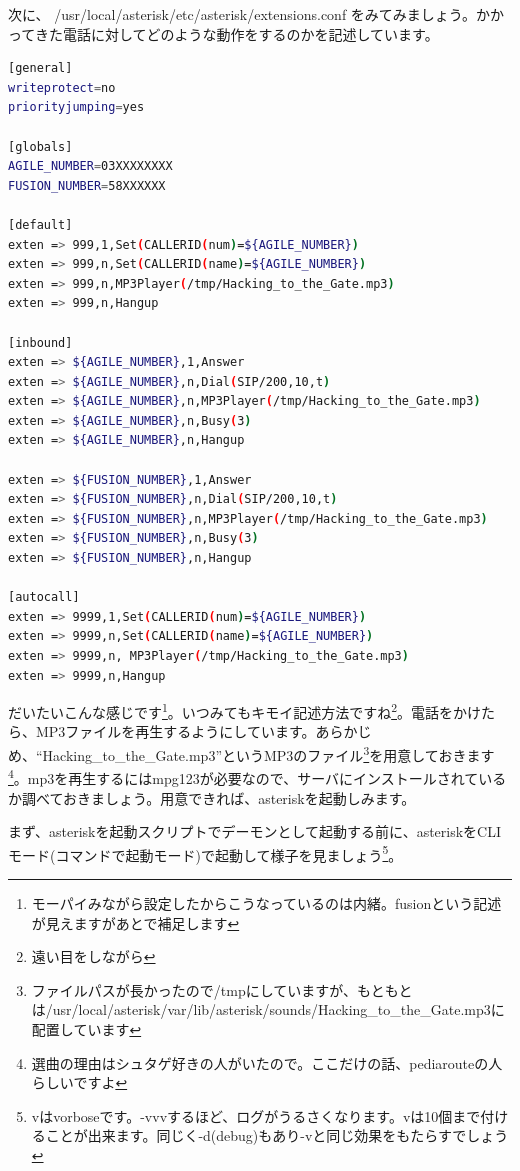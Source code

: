 次に、 /usr/local/asterisk/etc/asterisk/extensions.conf をみてみましょう。かかってきた電話に対してどのような動作をするのかを記述しています。

\begin{lstlisting}[language=bash,basicstyle=\scriptsize]
[general] 
writeprotect=no 
priorityjumping=yes 

[globals] 
AGILE_NUMBER=03XXXXXXXX
FUSION_NUMBER=58XXXXXX

[default] 
exten => 999,1,Set(CALLERID(num)=${AGILE_NUMBER}) 
exten => 999,n,Set(CALLERID(name)=${AGILE_NUMBER})
exten => 999,n,MP3Player(/tmp/Hacking_to_the_Gate.mp3) 
exten => 999,n,Hangup 

[inbound] 
exten => ${AGILE_NUMBER},1,Answer 
exten => ${AGILE_NUMBER},n,Dial(SIP/200,10,t) 
exten => ${AGILE_NUMBER},n,MP3Player(/tmp/Hacking_to_the_Gate.mp3) 
exten => ${AGILE_NUMBER},n,Busy(3)
exten => ${AGILE_NUMBER},n,Hangup 

exten => ${FUSION_NUMBER},1,Answer
exten => ${FUSION_NUMBER},n,Dial(SIP/200,10,t)
exten => ${FUSION_NUMBER},n,MP3Player(/tmp/Hacking_to_the_Gate.mp3)
exten => ${FUSION_NUMBER},n,Busy(3) 
exten => ${FUSION_NUMBER},n,Hangup

[autocall]
exten => 9999,1,Set(CALLERID(num)=${AGILE_NUMBER})
exten => 9999,n,Set(CALLERID(name)=${AGILE_NUMBER})
exten => 9999,n, MP3Player(/tmp/Hacking_to_the_Gate.mp3)
exten => 9999,n,Hangup

\end{lstlisting}

だいたいこんな感じです\footnote{モーパイみながら設定したからこうなっているのは内緒。fusionという記述が見えますがあとで補足します}。いつみてもキモイ記述方法ですね\footnote{遠い目をしながら}。電話をかけたら、MP3ファイルを再生するようにしています。あらかじめ、``Hacking\_to\_the\_Gate.mp3''というMP3のファイル\footnote{ファイルパスが長かったので/tmpにしていますが、もともとは/usr/local/asterisk/var/lib/asterisk/sounds/Hacking\_to\_the\_Gate.mp3に配置しています}を用意しておきます\footnote{選曲の理由はシュタゲ好きの人がいたので。ここだけの話、pediarouteの人らしいですよ}。mp3を再生するにはmpg123が必要なので、サーバにインストールされているか調べておきましょう。用意できれば、asteriskを起動しみます。

まず、asteriskを起動スクリプトでデーモンとして起動する前に、asteriskをCLIモード(コマンドで起動モード)で起動して様子を見ましょう\footnote{vはvorboseです。-vvvするほど、ログがうるさくなります。vは10個まで付けることが出来ます。同じく-d(debug)もあり-vと同じ効果をもたらすでしょう}。

